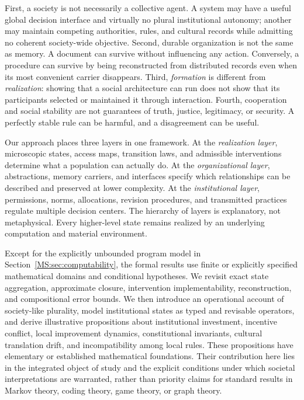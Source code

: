 First, a society is not necessarily a collective agent. A system may have a useful global decision interface and virtually no plural institutional autonomy; another may maintain competing authorities, rules, and cultural records while admitting no coherent society-wide objective. Second, durable organization is not the same as memory. A document can survive without influencing any action. Conversely, a procedure can survive by being reconstructed from distributed records even when its most convenient carrier disappears. Third, \emph{formation} is different from \emph{realization}: showing that a social architecture can run does not show that its participants selected or maintained it through interaction. Fourth, cooperation and social stability are not guarantees of truth, justice, legitimacy, or security. A perfectly stable rule can be harmful, and a disagreement can be useful.

Our approach places three layers in one framework. At the \emph{realization layer}, microscopic states, access maps, transition laws, and admissible interventions determine what a population can actually do. At the \emph{organizational layer}, abstractions, memory carriers, and interfaces specify which relationships can be described and preserved at lower complexity. At the \emph{institutional layer}, permissions, norms, allocations, revision procedures, and transmitted practices regulate multiple decision centers. The hierarchy of layers is explanatory, not metaphysical. Every higher-level state remains realized by an underlying computation and material environment.

Except for the explicitly unbounded program model in Section~\ref{MS:sec:computability}, the formal results use finite or explicitly specified mathematical domains and conditional hypotheses. We revisit exact state aggregation, approximate closure, intervention implementability, reconstruction, and compositional error bounds. We then introduce an operational account of society-like plurality, model institutional states as typed and revisable operators, and derive illustrative propositions about institutional investment, incentive conflict, local improvement dynamics, constitutional invariants, cultural translation drift, and incompatibility among local rules. These propositions have elementary or established mathematical foundations. Their contribution here lies in the integrated object of study and the explicit conditions under which societal interpretations are warranted, rather than priority claims for standard results in Markov theory, coding theory, game theory, or graph theory.

